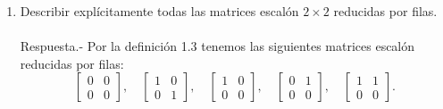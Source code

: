 \begin{enumerate}[\bfseries 1.]
    \item Describir explícitamente todas las matrices escalón $2\times 2$ reducidas por filas.\\\\
	Respuesta.-\; Por la definición 1.3 tenemos las siguientes matrices escalón reducidas por filas:
	$$
	\left[\begin{array}{cc}
		0&0\\
		0&0
	\end{array}\right],\quad 
	\left[\begin{array}{cc}
		1&0\\
		0&1
	\end{array}\right], \quad
	\left[\begin{array}{cc}
		1&0\\
		0&0
	\end{array}\right], \quad
	\left[\begin{array}{cc}
		0&1\\
		0&0
	\end{array}\right], \quad
	\left[\begin{array}{cc}
		1&1\\
		0&0
	\end{array}\right].
	$$
	\vspace{.5cm}



\end{enumerate}
